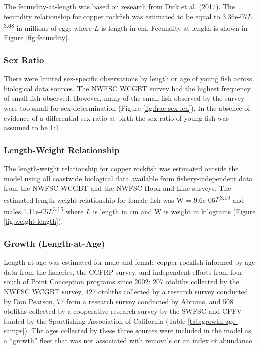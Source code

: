 \documentclass[11pt,
  english,
  letterpaper,
]{article}
\begin{document}
The fecundity-at-length was based on research from Dick et al. (2017). The fecundity relationship for copper rockfish was estimated to be equal to 3.36e-07\(L\)\textsuperscript{3.68} in millions of eggs where \(L\) is length in cm. Fecundity-at-length is shown in Figure \ref{fig:fecundity}.

\hypertarget{sex-ratio}{%
\subsubsection{Sex Ratio}\label{sex-ratio}}

There were limited sex-specific observations by length or age of young fish across biological data sources. The NWFSC WCGBT survey had the highest frequency of small fish observed. However, many of the small fish observed by the survey were too small for sex determination (Figure \ref{fig:frac-sex-len}). In the absence of evidence of a differential sex ratio at birth the sex ratio of young fish was assumed to be 1:1.

\hypertarget{length-weight-relationship}{%
\subsubsection{Length-Weight Relationship}\label{length-weight-relationship}}

The length-weight relationship for copper rockfish was estimated outside the model using all coastwide biological data available from fishery-independent data from the NWFSC WCGBT and the NWFSC Hook and Line surveys. The estimated length-weight relationship for female fish was W = 9.6e-06\(L\)\textsuperscript{3.19} and males 1.11e-05\(L\)\textsuperscript{3.15} where \(L\) is length in cm and W is weight in kilograms (Figure \ref{fig:weight-length}).

\hypertarget{length-at-age}{%
\subsubsection{Growth (Length-at-Age)}\label{length-at-age}}

Length-at-age was estimated for male and female copper rockfish informed by age data from the fisheries, the CCFRP survey, and independent efforts from four south of Point Conception programs since 2002: 207 otoliths collected by the NWFSC WCGBT survey, 427 otoliths collected by a research survey conducted by Don Pearson, 77 from a research survey conducted by Abrams, and 508 otoliths collected by a cooperative research survey by the SWFSC and CPFV funded by the Sportfishing Association of California (Table \ref{tab:growth-age-samps}). The ages collected by these three sources were included in the model as a ``growth'' fleet that was not associated with removals or an index of abundance.
\end{document}
